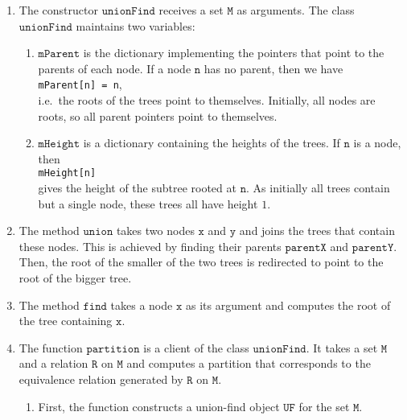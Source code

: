 \begin{enumerate}
\item The constructor $\texttt{unionFind}$ receives a set $\texttt{M}$ as arguments.  The class
      $\texttt{unionFind}$ maintains two variables:
      \begin{enumerate}
      \item $\texttt{mParent}$ is the dictionary implementing the pointers that point to the parents
             of each node.  If a node $\texttt{n}$ has no parent, then we have
             \\[0.2cm]
             \hspace*{1.3cm}
             \texttt{mParent[n] = n},
             \\[0.2cm]
             i.e.~the roots of the trees point to themselves.  Initially, all nodes are roots, so
             all parent pointers point to themselves.
      \item $\texttt{mHeight}$ is a dictionary containing the heights of the trees.  If $\texttt{n}$ is
            a node, then
            \\[0.2cm]
            \hspace*{1.3cm}
            \texttt{mHeight[n]}
            \\[0.2cm]
            gives the height of the subtree rooted at $\texttt{n}$. As initially all trees contain but
            a single node, these trees all have height $1$.
      \end{enumerate}
\item The method $\texttt{union}$ takes two nodes $\texttt{x}$ and $\texttt{y}$ and joins the trees that
      contain these nodes.  This is achieved by finding their parents $\texttt{parentX}$ and
      $\texttt{parentY}$.  Then, the root of the smaller of the two trees is redirected to point to
      the root of the bigger tree.
\item The method $\texttt{find}$ takes a node $\texttt{x}$ as its argument and computes the root of the
      tree containing $\texttt{x}$. 
\item The function $\texttt{partition}$ is a client of the class $\texttt{unionFind}$.  It takes a set
      $\texttt{M}$ and a relation $\texttt{R}$ on $\texttt{M}$ and computes a partition that corresponds
      to the equivalence relation generated by $\texttt{R}$ on $\texttt{M}$. 
      \begin{enumerate}
      \item First, the function constructs a union-find object $\texttt{UF}$ for the set $\texttt{M}$.

\end{enumerate}
\end{enumerate}
